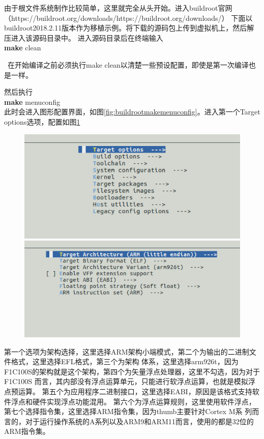 由于根文件系统制作比较简单，这里就完全从头开始。进入buildroot官网（{https://buildroot.org/downloads/}{https://buildroot.org/downloads/}）
下面以buildroot2018.2.11版本作为移植示例。将下载的源码包上传到虚拟机上，然后解压进入该源码目录中。
进入源码目录后在终端输入\\
\textbf{make} clean \\
\begin{tcolorbox}[colback=red!5!white,colframe=red!75!black]
	\faWarning \  
	在开始编译之前必须执行make clean以清楚一些预设配置，即使是第一次编译也是一样。
\end{tcolorbox}
然后执行\\
\textbf{make} menuconfig \\
此时会进入图形配置界面，如图\ref{fig:buildrootmakemenuconfig}。进入第一个Target 
options选项，配置如图\ref{fig:buildarch}
\begin{figure}[htbp]
	\centering
	\begin{minipage}[c]{0.5\textwidth}
	\centering
	\includegraphics[width=0.98\linewidth]{chapter2/img/buildrootmakemenuconfig}
	\caption{}
	\label{fig:buildrootmakemenuconfig}
	\end{minipage}%
	\begin{minipage}[c]{0.5\textwidth}
	\centering
	\includegraphics[width=0.98\linewidth]{chapter2/img/buildarch}
	\caption{}
	\label{fig:buildarch}
	\end{minipage}
\end{figure}
第一个选项为架构选择，这里选择ARM架构小端模式，第二个为输出的二进制文件格式，这里选择EFL格式，第三个为架构
体系，这里选择arm926t，因为F1C100S的架构就是这个架构，第四个为矢量浮点处理器，这里不勾选，因为对于F1C100S
而言，其内部没有浮点运算单元，只能进行软浮点运算，也就是模拟浮点预运算。
第五个为应用程序二进制接口，这里选择EABI，原因是该格式支持软件浮点和硬件实现浮点功能混用。
第六个为浮点运算规则，这里使用软件浮点，第七个选择指令集，这里选择ARM指令集，因为thumb主要针对Cortex M系
列而言的，对于运行操作系统的A系列以及ARM9和ARM11而言，使用的都是32位的ARM指令集。


